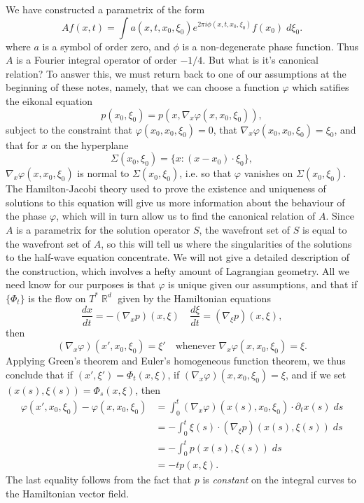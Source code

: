 \documentclass{article}
\theoremstyle{plain}
\theoremstyle{remark}
\theoremstyle{definition}
\DeclareMathOperator{\RR}{\mathbb{R}}
\begin{document}
We have constructed a parametrix of the form
%
\[ Af(x,t) = \int a(x,t,x_0,\xi_0) e^{2 \pi i \phi(x,t,x_0,\xi_0)} f(x_0)\; d\xi_0. \]
%
where $a$ is a symbol of order zero, and $\phi$ is a non-degenerate phase function. Thus $A$ is a Fourier integral operator of order $-1/4$. But what is it's canonical relation? To answer this, we must return back to one of our assumptions at the beginning of these notes, namely, that we can choose a function $\varphi$ which satifies the eikonal equation
%
\[ p(x_0,\xi_0) = p(x, \nabla_x \varphi(x,x_0,\xi_0)), \]
%
subject to the constraint that $\varphi(x_0,x_0,\xi_0) = 0$, that $\nabla_x \varphi(x_0,x_0,\xi_0) = \xi_0$, and that for $x$ on the hyperplane
%
\[ \Sigma(x_0,\xi_0) = \{ x : (x - x_0) \cdot \xi_0 \}, \]
%
$\nabla_x \varphi(x,x_0,\xi_0)$ is normal to $\Sigma(x_0,\xi_0)$, i.e. so that $\varphi$ vanishes on $\Sigma(x_0,\xi_0)$. The Hamilton-Jacobi theory used to prove the existence and uniqueness of solutions to this equation will give us more information about the behaviour of the phase $\varphi$, which will in turn allow us to find the canonical relation of $A$. Since $A$ is a parametrix for the solution operator $S$, the wavefront set of $S$ is equal to the wavefront set of $A$, so this will tell us where the singularities of the solutions to the half-wave equation concentrate. We will not give a detailed description of the construction, which involves a hefty amount of Lagrangian geometry. All we need know for our purposes is that $\varphi$ is unique given our assumptions, and that if $\{ \Phi_t \}$ is the flow on $T^* \RR^d$ given by the Hamiltonian equations
%
\[ \frac{dx}{dt} = - (\nabla_x p)(x,\xi) \quad \frac{d\xi}{dt} = (\nabla_\xi p)(x,\xi), \]
%
then
%
\[ (\nabla_x \varphi)(x',x_0,\xi_0) = \xi' \quad\text{whenever $\nabla_x \varphi(x,x_0,\xi_0) = \xi$}. \]
%
Applying Green's theorem and Euler's homogeneous function theorem, we thus conclude that if $(x',\xi') = \Phi_t(x,\xi)$, if $(\nabla_x \varphi)(x,x_0,\xi_0) = \xi$, and if we set $(x(s), \xi(s)) = \Phi_s(x,\xi)$, then
%
\begin{align*}
	\varphi(x',x_0,\xi_0) - \varphi(x,x_0,\xi_0) &= \int_0^t (\nabla_x \varphi)(x(s),x_0,\xi_0) \cdot \partial_t x(s)\; ds\\
	&= - \int_0^t \xi(s) \cdot (\nabla_\xi p)(x(s), \xi(s))\; ds\\
	&= - \int_0^t p(x(s), \xi(s))\; ds\\
	&= - t p(x,\xi).
\end{align*}
%
The last equality follows from the fact that $p$ is \emph{constant} on the integral curves to the Hamiltonian vector field.
\end{document}
